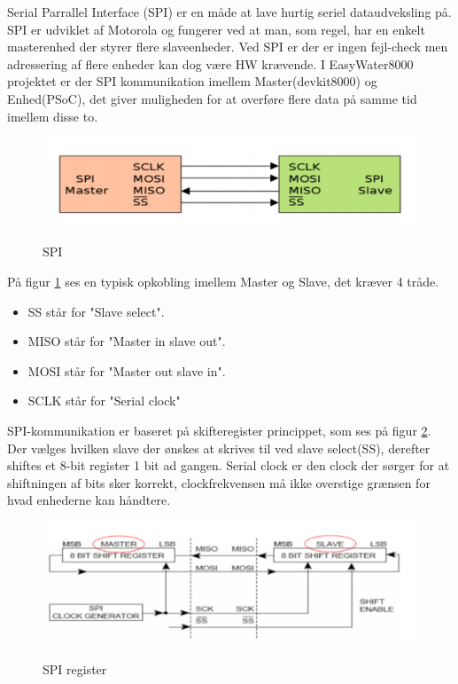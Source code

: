 Serial Parrallel Interface (SPI) er en måde at lave hurtig seriel dataudveksling på. SPI er udviklet af Motorola og fungerer ved at man, som regel, har en enkelt masterenhed der styrer flere slaveenheder. Ved SPI er der er ingen fejl-check men adressering af flere enheder kan dog være HW krævende. I EasyWater8000 projektet er der SPI kommunikation imellem Master(devkit8000)
og Enhed(PSoC), det giver muligheden for at overføre flere data på samme tid imellem disse to.

\begin{figure}[H] \centering
{\includegraphics[width=\textwidth]{filer/design/Billeder/SPI_MASTER_SLAVE}}
\caption{SPI}
\label{lab:SPI}
\raggedright
\end{figure}

På figur \ref{lab:SPI} ses en typisk opkobling imellem Master og Slave, det kræver 4 tråde.
\begin{itemize}
 	\item SS står for "Slave select".
 	\item MISO står for "Master in slave out".
 	\item MOSI står for "Master out slave in". 
	\item SCLK står for "Serial clock" 
\end{itemize}

SPI-kommunikation er baseret på skifteregister princippet, som ses på figur \ref{lab:SPI_REGISTER}. Der vælges hvilken slave der 
ønskes at skrives til ved slave select(SS), derefter shiftes et 8-bit register 1 bit ad gangen. Serial clock er den clock der sørger for at
shiftningen af bits sker korrekt, clockfrekvensen må ikke overstige grænsen for hvad enhederne kan håndtere.

\begin{figure}[H] \centering
{\includegraphics[width=\textwidth]{filer/design/Billeder/SPI_REGISTER}}
\caption{SPI register}
\label{lab:SPI_REGISTER}
\raggedright
\end{figure}  

